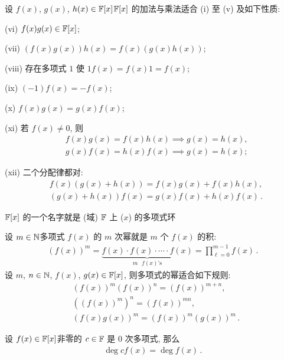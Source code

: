 \begin{proposition}
    设 $f(x)$, $g(x)$, $h(x) \in \mathbb{F}[x]$\period $\mathbb{F}[x]$ 的加法与乘法适合 (i) 至 (v) 及如下性质:

    (vi) $f(x) g(x) \in \mathbb{F}[x]$;

    (vii) $(f(x) g(x)) h(x) = f(x) (g(x) h(x))$;

    (viii) 存在多项式 $1$ 使 $1f(x) = f(x)1 = f(x)$;

    (ix) $(-1)f(x) = -f(x)$;

    (x) $f(x) g(x) = g(x) f(x)$;

    (xi) 若 $f(x) \neq 0$, 则
    \begin{align*}
         & f(x) g(x) = f(x) h(x) \implies g(x) = h(x), \\
         & g(x) f(x) = h(x) f(x) \implies g(x) = h(x);
    \end{align*}

    (xii) 二个分配律都对:
    \begin{align*}
         & f(x) (g(x) + h(x)) = f(x) g(x) + f(x) h(x),        \\
         & (g(x) + h(x)) f(x) = g(x) f(x) + h(x) f(x) \period
    \end{align*}
\end{proposition}

\begin{remark}
    $\mathbb{F}[x]$ 的一个名字就是 (域) $\mathbb{F}$ 上 ($x$) 的多项式环\period
\end{remark}

\begin{definition}
    设 $m \in \mathbb{N}$\period 多项式 $f(x)$ 的 $m$ 次幂就是 $m$ 个 $f(x)$ 的积:
    \begin{align*}
        (f(x))^m = \underbrace{f(x) \cdot f(x) \cdot \cdots \cdot f(x)}_{\text{$m$ $f(x)$'s}} = \prod_{\ell = 0}^{m-1} f(x) \period
    \end{align*}
    设 $m$, $n \in \mathbb{N}$, $f(x)$, $g(x) \in \mathbb{F}[x]$, 则多项式的幂适合如下规则:
    \begin{align*}
         & (f(x))^m (f(x))^n = (f(x))^{m+n},         \\
         & ((f(x))^m)^n = (f(x))^{mn},               \\
         & (f(x) g(x))^m = (f(x))^m (g(x))^m \period
    \end{align*}
\end{definition}

\begin{proposition}
    设 $f(x) \in \mathbb{F}[x]$\period 非零的 $c \in \mathbb{F}$ 是 $0$ 次多项式, 那么
    \begin{align*}
        \deg cf(x) = \deg f(x) \period
    \end{align*}
\end{proposition}

